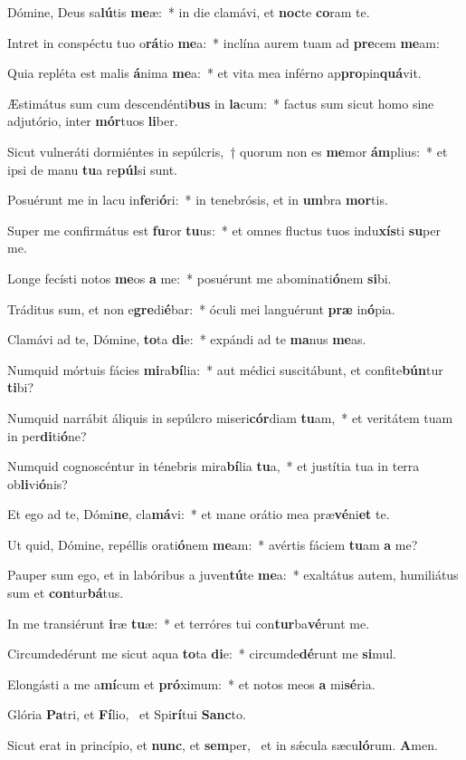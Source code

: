 \item Dómine, Deus sa\textbf{lú}tis \textbf{me}æ:~* in die clamávi, et \textbf{noc}te \textbf{co}ram te.
\item Intret in conspéctu tuo o\textbf{rá}tio \textbf{me}a:~* inclína aurem tuam ad \textbf{pre}cem \textbf{me}am:
\item Quia repléta est malis \textbf{á}nima \textbf{me}a:~* et vita mea inférno ap\textbf{pro}pin\textbf{quá}vit.
\item Æstimátus sum cum descendénti\textbf{bus} in \textbf{la}cum:~* factus sum sicut homo sine adjutório, inter \textbf{mór}tuos \textbf{li}ber.
\item Sicut vulneráti dormiéntes in sepúlcris,~† quorum non es \textbf{me}mor \textbf{ám}plius:~* et ipsi de manu \textbf{tu}a re\textbf{púl}si sunt.
\item Posuérunt me in lacu in\textbf{fe}ri\textbf{ó}ri:~* in tenebrósis, et in \textbf{um}bra \textbf{mor}tis.
\item Super me confirmátus est \textbf{fu}ror \textbf{tu}us:~* et omnes fluctus tuos indu\textbf{xís}ti \textbf{su}per me.
\item Longe fecísti notos \textbf{me}os \textbf{a} me:~* posuérunt me abominati\textbf{ó}nem \textbf{si}bi.
\item Tráditus sum, et non e\textbf{gre}di\textbf{é}bar:~* óculi mei languérunt \textbf{præ} in\textbf{ó}pia.
\item Clamávi ad te, Dómine, \textbf{to}ta \textbf{di}e:~* expándi ad te \textbf{ma}nus \textbf{me}as.
\item Numquid mórtuis fácies \textbf{mi}ra\textbf{bí}lia:~* aut médici suscitábunt, et confite\textbf{bún}tur \textbf{ti}bi?
\item Numquid narrábit áliquis in sepúlcro miseri\textbf{cór}diam \textbf{tu}am,~* et veritátem tuam in per\textbf{di}ti\textbf{ó}ne?
\item Numquid cognoscéntur in ténebris mira\textbf{bí}lia \textbf{tu}a,~* et justítia tua in terra ob\textbf{li}vi\textbf{ó}nis?
\item Et ego ad te, Dómi\textbf{ne}, cla\textbf{má}vi:~* et mane orátio mea præ\textbf{vé}ni\textbf{et} te.
\item Ut quid, Dómine, repéllis orati\textbf{ó}nem \textbf{me}am:~* avértis fáciem \textbf{tu}am \textbf{a} me?
\item Pauper sum ego, et in labóribus a juven\textbf{tú}te \textbf{me}a:~* exaltátus autem, humiliátus sum et \textbf{con}tur\textbf{bá}tus.
\item In me transiérunt \textbf{i}ræ \textbf{tu}æ:~* et terróres tui con\textbf{tur}ba\textbf{vé}runt me.
\item Circumdedérunt me sicut aqua \textbf{to}ta \textbf{di}e:~* circumde\textbf{dé}runt me \textbf{si}mul.
\item Elongásti a me a\textbf{mí}cum et \textbf{pró}ximum:~* et notos meos \textbf{a} mi\textbf{sé}ria.
\item Glória \textbf{Pa}tri, et \textbf{Fí}lio,~\psstar{} et Spi\textbf{rí}tui \textbf{Sanc}to.
\item Sicut erat in princípio, et \textbf{nunc}, et \textbf{sem}per,~\psstar{} et in sǽcula sæcu\textbf{ló}rum. \textbf{A}men.
